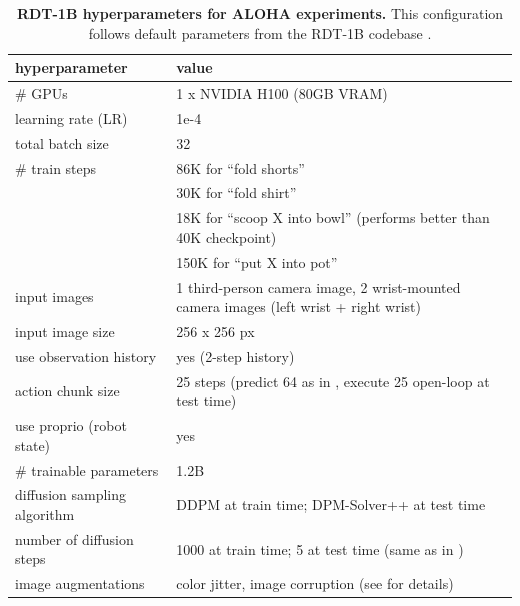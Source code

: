 \documentclass[conference]{IEEEtran}
\begin{document}
\begin{table}
\centering
\caption{\textbf{RDT-1B hyperparameters for ALOHA experiments.} This configuration follows default parameters from the RDT-1B codebase \citep{liu2024rdt}.}
\label{tab:rdt_hyperparameters_aloha}
\begin{tabular}{ll}
\toprule
hyperparameter & value \\
\midrule
\# GPUs & 1 x NVIDIA H100 (80GB VRAM) \\
learning rate (LR) & 1e-4 \\
total batch size & 32 \\
\# train steps & 86K for ``fold shorts'' \\
& 30K for ``fold shirt'' \\
& 18K for ``scoop X into bowl'' (performs better than 40K checkpoint) \\
& 150K for ``put X into pot'' \\
input images & 1 third-person camera image, 2 wrist-mounted camera images (left wrist + right wrist) \\
input image size & 256 x 256 px \\
use observation history & yes (2-step history) \\
action chunk size & 25 steps (predict 64 as in \citep{liu2024rdt}, execute 25 open-loop at test time) \\
use proprio (robot state) & yes \\
\# trainable parameters & 1.2B \\
diffusion sampling algorithm & DDPM \citep{ho2020denoising} at train time; DPM-Solver++ \citep{lu2022dpm} at test time \\
number of diffusion steps & 1000 at train time; 5 at test time (same as in \citep{liu2024rdt}) \\
image augmentations & color jitter, image corruption (see \citep{liu2024rdt} for details) \\
\bottomrule
\end{tabular}
\end{table}
\end{document}
